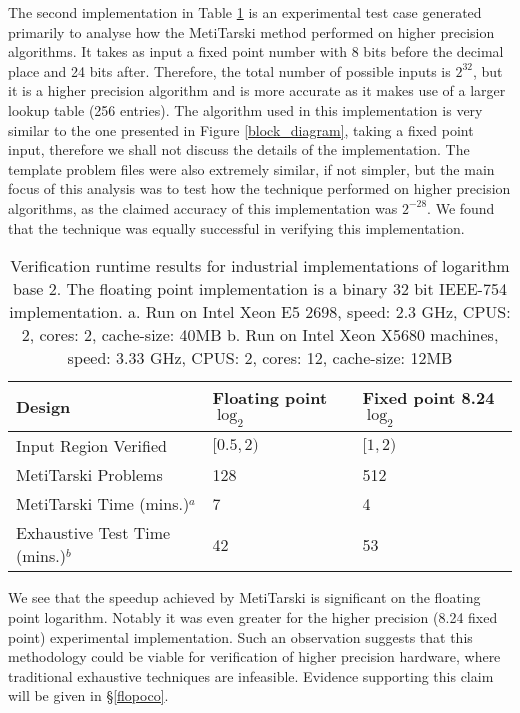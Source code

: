 \documentclass{fac}
\begin{document}
The second implementation in Table \ref{result} is an experimental test case generated primarily to analyse how the MetiTarski method performed on higher precision algorithms. It takes as input a fixed point number with 8 bits before the decimal place and 24 bits after. Therefore, the total number of possible inputs is $2^{32}$, but it is a higher precision algorithm and is more accurate as it makes use of a larger lookup table (256 entries). The algorithm used in this implementation is very similar to the one presented in Figure \ref{block_diagram}, taking a fixed point input, therefore we shall not discuss the details of the implementation. The template problem files were also extremely similar, if not simpler, but the main focus of this analysis was to test how the technique performed on higher precision algorithms, as the claimed accuracy of this implementation was $2^{-28}$. We found that the technique was equally successful in verifying this implementation. 

\begin{table}
\begin{tabular}{lll}\toprule
Design & Floating point $\log_2$ & Fixed point 8.24 $\log_2$    \\
\midrule
 Input Region Verified& $[0.5,2)$ & $[1,2) $ \\ 
 MetiTarski Problems & 128 & 512 \\
 MetiTarski Time (mins.)$^a$ &  7 & 4 \\ 
 Exhaustive Test Time (mins.)$^b$ & 42 & 53 \\
\bottomrule
\end{tabular}
\caption{Verification runtime results for industrial implementations of logarithm base 2. The floating point implementation is a binary 32 bit IEEE-754 implementation.\newline
a. Run on Intel Xeon E5 2698, speed: 2.3 GHz, CPUS: 2, cores: 2, cache-size: 40MB
\newline
b. Run on Intel Xeon X5680 machines, speed: 3.33 GHz, CPUS: 2, cores: 12, cache-size: 12MB}\label{result}     
\end{table}

We see that the speedup achieved by MetiTarski is significant on the floating point logarithm. Notably it was even greater for the higher precision (8.24 fixed point) experimental implementation. Such an observation suggests that this methodology could be viable for verification of higher precision hardware, where traditional exhaustive techniques are infeasible. Evidence supporting this claim will be given in \S \ref{flopoco}.
\end{document}

